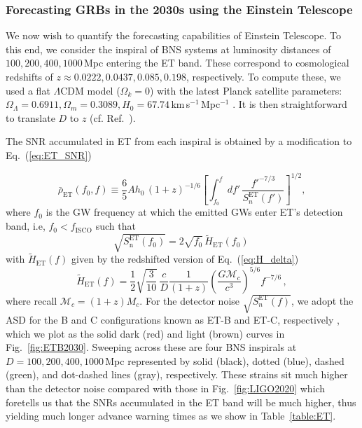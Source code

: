 \documentclass[prd,amsmath,amssymb,aps,floats,amsfonts,notitlepage,superscriptaddress,eqsecnum,nofootinbib,10pt]{revtex4-1}
\newcommand{\f}{\frac}
\newcommand{\be}{\begin{equation}}
\newcommand{\ee}{\end{equation}}
\begin{document}
\subsubsection{Forecasting GRBs in the 2030s using the Einstein Telescope}\label{Sec:ETB}
We now wish to quantify the forecasting capabilities of Einstein Telescope. To this end, we consider the inspiral of BNS systems
at luminosity distances of $100,200,400,1000\,$Mpc entering the ET band. 
These correspond to cosmological redshifts of $z\approx 0.0222,0.0437, 0.085, 0.198$, respectively.
To compute these, we used a flat $\Lambda$CDM model ($\Omega_k=0$) with the latest Planck satellite parameters: 
$\Omega_\Lambda = 0.6911, \Omega_m = 0.3089, H_0 = 67.74\,$km\,s$^{-1}\,$Mpc$^{-1}$ \cite{Planck2015}. %
It is then straightforward to translate $D$ to $z$ (cf. Ref.~\cite{Hogg:1999ad}).


The SNR accumulated in ET from each inspiral is obtained by a modification to Eq.~(\ref{eq:ET_SNR})

%
\be
\bar\rho_{\text{ET}}(f_0,f)\equiv \f{6}{5}A h_0\, (1+z)^{-1/6}\left[\int_{f_0}^{f} d f'\, \f{f'^{-7/3}}{S^\text{ET}_n(f')}\right]^{1/2} \label{eq:ET_SNRv2},
\ee
where $f_0$ is the GW frequency at which the emitted GWs enter ET's detection band, i.e, $f_0 < f_\text{ISCO}$ such that
%
 \be
 \sqrt{S^\text{ET}_\text{n}(f_0)} = 2\sqrt{f_0}\, \tilde{H}_\text{ET}(f_0) \label{eq:f0_ET}\,
 \ee
with $\tilde{H}_\text{ET}(f)$ given by the redshifted version of Eq.~(\ref{eq:H_delta})
%
\be
\tilde{H}_\text{ET}(f) = \f{1}{2}\sqrt{\f{3}{10}}\, \f{c}{D}\f{1}{(1+z)}\left(\f{G \mathcal{M}_c}{c^3}\right)^{5/6} f^{-7/6}\, , \label{eq:H_delta_redshifted}
\ee
%
where recall $\mathcal{M}_c = (1+z)M_c$.
For the detector noise $\sqrt{S^\text{ET}_n(f)}$, we adopt the ASD for the B and C configurations known as ET-B and ET-C, respectively \cite{Hild:2010id}, which we plot as the solid dark (red) and light (brown) curves in Fig.~\ref{fig:ETB2030}.
Sweeping across these are four BNS inspirals at $D=100,200,400,1000\,$Mpc represented by solid (black), dotted (blue), dashed (green),
and dot-dashed lines (gray), respectively. These strains sit much higher than the detector noise
compared with those in Fig.~\ref{fig:LIGO2020} which foretells us that the SNRs accumulated in the ET band will be much higher, 
thus yielding much longer advance warning times as we show in Table~\ref{table:ET}.
\end{document}
